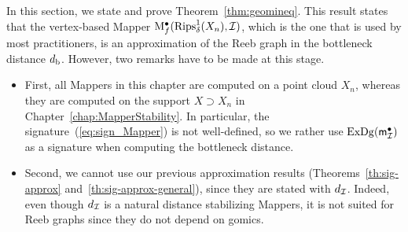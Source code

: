 In this section, we state and prove Theorem~\ref{thm:geomineq}. This result states that 
the vertex-based Mapper $\mathrm{M}^\bullet_f(\mathrm{Rips}_\delta^1(X_n),\mathcal{I})$,
which is the one that is used by most practitioners, is an approximation of the Reeb graph
in the bottleneck distance $d_{\rm b}$. %
However, two remarks have to be made at this stage.
\begin{itemize}

\item First, all Mappers in this chapter are computed on a point cloud $X_n$, whereas 
they are computed on the support $X\supset X_n$ in  Chapter~\ref{chap:MapperStability}.
In particular, the signature~(\ref{eq:sign_Mapper}) is not well-defined,
so we rather use $\mathrm{ExDg}({\sf m}_{\mathcal I}^\bullet)$ as a signature when computing the bottleneck distance.


\item Second, we cannot use our  previous approximation
results (Theorems~\ref{th:sig-approx} and~\ref{th:sig-approx-general}), since they are stated with $d_{\mathcal{I}}$. Indeed, even though 
$d_{\mathcal{I}}$ is a natural distance stabilizing Mappers, it is not suited for Reeb graphs since they do not depend on gomics.



\end{itemize}
